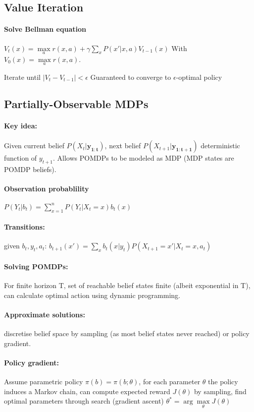 \begin{multicols}{4}
\subsection{Value Iteration}
\paragraph{Solve Bellman equation} $V_t(x) = \max\limits_a r(x,a) + \gamma \sum\limits_{x}P(x'|x,a)V_{t-1}(x)$
With $V_0(x) = \max\limits_a r(x,a)$.

Iterate until $|V_t - V_{t-1}| < \epsilon$
Guaranteed to converge to $\epsilon$-optimal policy

\subsection{Partially-Observable MDPs}
\paragraph{Key idea:} Given current belief $P(X_t|\bm{y_{1:t}})$, next belief $P(X_{t+1}|\bm{y_{1:t+1}})$ deterministic function of $y_{t+1}$. Allows POMDPs to be modeled as MDP (MDP states are POMDP beliefs).
\paragraph{Observation probablility} $P(Y_t|b_t) = \sum\limits_{x=1}^nP(Y_t | X_t = x)b_t(x)$
\paragraph{Transitions:} given $b_t, y_t, a_t$: $b_{t+1}(x') = \sum\limits_x b_t(x|y_t)P(X_{t+1} = x' | X_t = x,a_t)$
\paragraph{Solving POMDPs:} For finite horizon T, set of reachable belief states finite (albeit exponential in T), can calculate optimal action using dynamic programming.
\paragraph{Approximate solutions:} discretise belief space by sampling (as most belief states never reached) or policy gradient.
\paragraph{Policy gradient:} Assume parametric policy $\pi(b) = \pi(b;\theta)$, for each parameter $\theta$ the policy induces a Markov chain, can compute expected reward $J(\theta)$ by sampling, find optimal parameters through search (gradient ascent) $\theta^* = \arg\max\limits_{\theta} J(\theta)$

\end{multicols}
